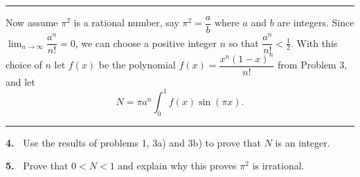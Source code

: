 \documentclass[12pt]{article}
\theoremstyle{definition}
\theoremstyle{remark}
\theoremstyle{definition}
\begin{document}
\vskip10pt
\rule{\textwidth}{1pt}

Now assume $\pi^2$ is a rational number, say $\pi^2=\dfrac{a}{b}$ where $a$ and $b$ are integers. Since $\lim_{n\to\infty}\dfrac{a^{n}}{n!}=0$, we can choose a positive integer $n$ so that $\dfrac{a^{n}}{n!}<\frac{1}{2}$. 
With this choice of $n$ let $f(x)$ be the  polynomial 
$f(x)=\dfrac{x^n(1-x)^n}{n!}$ from Problem 3, and let 
\[N= \pi a^{n}\int_0^1 f(x)\sin(\pi x).\]


\rule{\textwidth}{1pt}

\vskip10pt
{\bf 4.\ } Use the results of problems 1, 3a) and 3b) to prove that $N$
is an integer. 


\vskip10pt
{\bf 5.\ } Prove that
$0<N<1$
and explain why this proves $\pi^2$ is irrational. 
\end{document}
